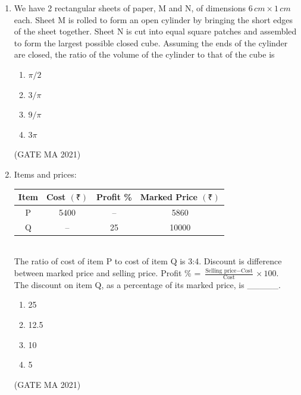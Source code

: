 \documentclass[journal,12pt,onecolumn]{IEEEtran}
\theoremstyle{remark}
\begin{document}
\begin{enumerate}
    \item We have 2 rectangular sheets of paper, M and N, of dimensions $6\,cm \times 1\,cm$ each. Sheet M is rolled to form an open cylinder by bringing the short edges of the sheet together. Sheet N is cut into equal square patches and assembled to form the largest possible closed cube. Assuming the ends of the cylinder are closed, the ratio of the volume of the cylinder to that of the cube is
    \begin{enumerate}
        \item $\pi/2$
        \item $3/\pi$
        \item $9/\pi$
        \item $3\pi$
    \end{enumerate}
\hfill(GATE MA 2021)
    \item Items and prices: \\
    \begin{tabular}{|c|c|c|c|}
        \hline
        Item & Cost $(₹)$ & Profit \% & Marked Price $(₹)$ \\
        \hline
        P & 5400 & -- & 5860 \\
        Q & -- & 25 & 10000 \\
        \hline
    \end{tabular} \\
    
    The ratio of cost of item P to cost of item Q is 3:4. Discount is difference between marked price and selling price. Profit \% = $\frac{\text{Selling price} - \text{Cost}}{\text{Cost}} \times 100$. \\
    The discount on item Q, as a percentage of its marked price, is \_\_\_\_\_.
    \begin{enumerate}
        \item 25
        \item 12.5
        \item 10
        \item 5
    \end{enumerate}
    \hfill(GATE MA 2021)


\end{enumerate}
\end{document}
